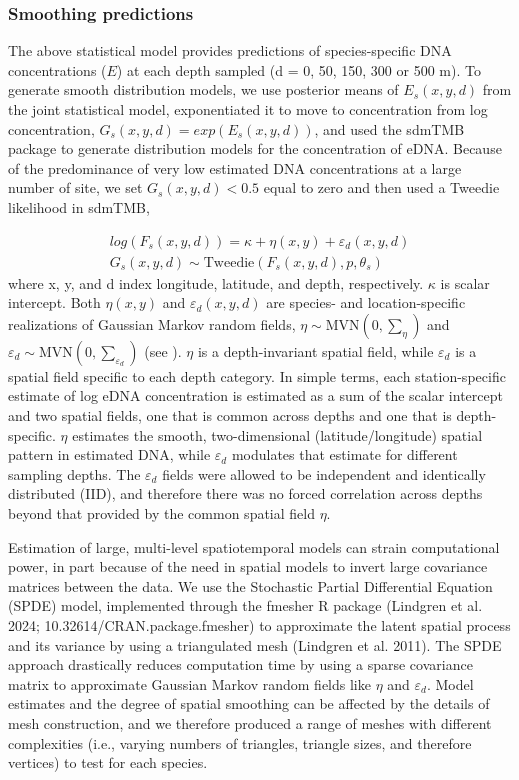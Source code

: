 \documentclass{article}
\begin{document}
\subsubsection*{Smoothing predictions}

The above statistical model provides predictions of species-specific DNA concentrations ($E$) at each depth sampled (d = 0, 50, 150, 300 or 500 m). To generate smooth distribution models, we use posterior means of $E_s(x,y,d)$ from the joint statistical model, exponentiated it to move to concentration from log concentration, $G_{s}(x,y,d) = exp(E_{s}(x,y,d))$, and used the sdmTMB package \cite{anderson2022} to generate distribution models for the concentration of eDNA. Because of the predominance of very low estimated DNA concentrations at a large number of site, we set $G_{s}(x,y,d) < 0.5$ equal to zero and then used a Tweedie likelihood in sdmTMB,

\begin{align} 
	 log(F_s(x,y,d)) = \kappa + \eta(x,y) + \varepsilon_{d}(x,y,d) \\
	 G_{s}(x,y,d) \sim \mathrm{Tweedie}(F_s(x,y,d),p ,\theta_s)
\end{align}
where x, y, and d index longitude, latitude, and depth, respectively.   $\kappa$ is scalar intercept. Both $\eta(x,y)$ and $\varepsilon_d(x,y,d)$ are species- and location-specific realizations of Gaussian Markov random fields, $\eta \sim  \mathrm{MVN}(0,\sum_\eta)$ and $\varepsilon_d \sim  \mathrm{MVN}(0,\sum_{\varepsilon_d})$ (see \cite{anderson2022}).  $\eta$ is a depth-invariant spatial field, while $\varepsilon_d$ is a spatial field specific to each depth category. In simple terms, each station-specific estimate of log eDNA concentration is estimated as a sum of the scalar intercept and two spatial fields, one that is common across depths and one that is depth-specific. $\eta$ estimates the smooth, two-dimensional (latitude/longitude) spatial pattern in estimated DNA, while $\varepsilon_d$ modulates that estimate for different sampling depths. The $\varepsilon_d$ fields were allowed to be independent and identically distributed (IID), and therefore there was no forced correlation across depths beyond that provided by the common spatial field $\eta$. 

Estimation of large, multi-level spatiotemporal models can strain computational power, in part because of the need in spatial models to invert large covariance matrices between the data. We use the Stochastic Partial Differential Equation (SPDE) model, implemented through the fmesher R package (Lindgren et al. 2024; 10.32614/CRAN.package.fmesher) to approximate the latent spatial process and its variance by using a triangulated mesh (Lindgren et al. 2011). The SPDE approach drastically reduces computation time by using a sparse covariance matrix to approximate Gaussian Markov random fields like $\eta$ and $\varepsilon_d$. Model estimates and the degree of spatial smoothing can be affected by the details of mesh construction, and we therefore produced a range of meshes with different complexities (i.e., varying numbers of triangles, triangle sizes, and therefore vertices) to test for each species. 
\end{document}
